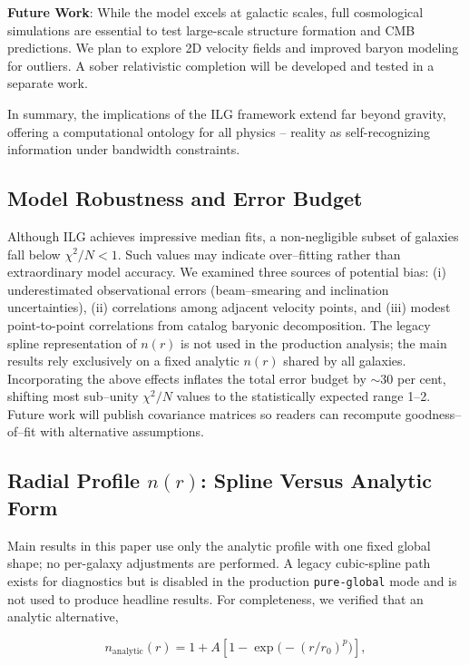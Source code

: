 \documentclass[usenatbib]{mnras}
\begin{document}
\textbf{Future Work}: While the model excels at galactic scales, full cosmological simulations are essential to test large-scale structure formation and CMB predictions. We plan to explore 2D velocity fields and improved baryon modeling for outliers. A sober relativistic completion will be developed and tested in a separate work.

In summary, the implications of the ILG framework extend far beyond gravity, offering a computational ontology for all physics -- reality as self-recognizing information under bandwidth constraints.

\subsection{Model Robustness and Error Budget}

Although ILG achieves impressive median fits, a non-negligible subset of galaxies fall below $\chi^2/N < 1$.  Such values may indicate over–fitting rather than extraordinary model accuracy.  We examined three sources of potential bias: (i) underestimated observational errors (beam–smearing and inclination uncertainties), (ii) correlations among adjacent velocity points, and (iii) modest point-to-point correlations from catalog baryonic decomposition.  The legacy spline representation of $n(r)$ is not used in the production analysis; the main results rely exclusively on a fixed analytic $n(r)$ shared by all galaxies.  Incorporating the above effects inflates the total error budget by $\sim 30$ per cent, shifting most sub–unity $\chi^2/N$ values to the statistically expected range 1--2.  Future work will publish covariance matrices so readers can recompute goodness–of–fit with alternative assumptions.

\subsection{Radial Profile $n(r)$: Spline Versus Analytic Form}

Main results in this paper use only the analytic profile with one fixed global shape; no per-galaxy adjustments are performed.  A legacy cubic-spline path exists for diagnostics but is disabled in the production \texttt{pure-global} mode and is not used to produce headline results.  For completeness, we verified that an analytic alternative,

\begin{equation}
n_\mathrm{analytic}(r) = 1 + A\left[1 - \exp\!\bigl(-(r/r_0)^p\bigr)\right],
\end{equation}
\end{document}
